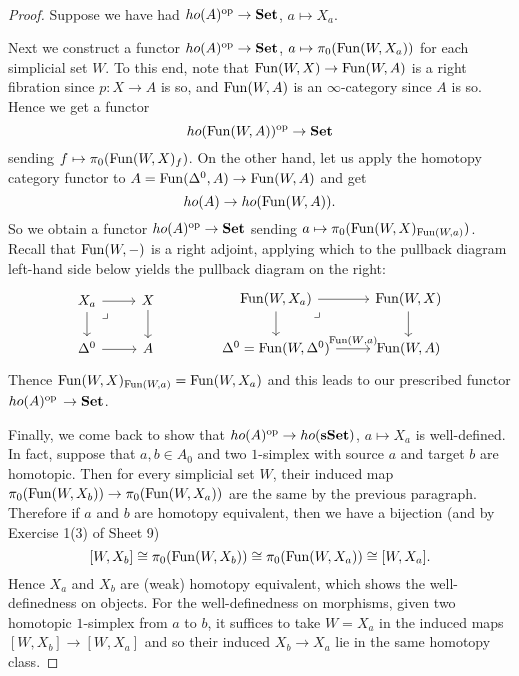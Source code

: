 \documentclass[a4paper,11pt,openany]{scrartcl}
\begin{document}
~\\
\begin{proof}
Suppose we have had $ho(A)^{\operatorname{op}}\to\operatorname{\mathbf{Set}}$, $a\mapsto X_a$.

Next we construct a functor $ho(A)^{\operatorname{op}}\to\operatorname{\mathbf{Set}}$, $a\mapsto\pi_0(\operatorname{Fun}(W,X_a))$ for each simplicial set $W$. To this end, note that $\operatorname{Fun}(W,X)\to\operatorname{Fun}(W,A)$ is a right fibration since $p\colon X\to A$ is so, and $\operatorname{Fun}(W,A)$ is an $\infty$-category since $A$ is so. Hence we get a functor 
\[
ho(\operatorname{Fun}(W,A))^{\operatorname{op}}\to\operatorname{\mathbf{Set}}
\]
sending $f\mapsto\pi_0(\operatorname{Fun}(W,X)_f)$. On the other hand, let us apply the homotopy category functor to $A=\operatorname{Fun}(\Delta^0,A)\to\operatorname{Fun}(W,A)$ and get 
\[
ho(A)\to ho(\operatorname{Fun}(W,A)).
\]
So we obtain a functor $ho(A)^{\operatorname{op}}\to\operatorname{\mathbf{Set}}$ sending $a\mapsto\pi_0(\operatorname{Fun}(W,X)_{\operatorname{Fun}(W,a)})$. Recall that $\operatorname{Fun}(W,-)$ is a right adjoint, applying which to the pullback diagram left-hand side below yields the pullback diagram on the right:
\[
\begin{tikzcd}
X_a\arrow[r]\arrow[d]\arrow[dr,phantom,"\lrcorner",very near start]& X\arrow[d]\\
\Delta^0\arrow[r]& A
\end{tikzcd}
\qquad\qquad
\begin{tikzcd}
\Fun(W,X_a)\arrow[r]\arrow[d]\arrow[dr,phantom,"\lrcorner",very near start]& \Fun(W,X)\arrow[d]\\
\Delta^0=\Fun(W,\Delta^0)\arrow[r,"\Fun(W\text{,}a)"]& \Fun(W,A)
\end{tikzcd}
\]
Thence $\operatorname{Fun}(W,X)_{\operatorname{Fun}(W,a)}=\operatorname{Fun}(W,X_a)$ and this leads to our prescribed functor $ho(A)^{\operatorname{op}}$ $\to\operatorname{\mathbf{Set}}$.

Finally, we come back to show that $ho(A)^{\operatorname{op}}\to ho(\operatorname{\mathbf{sSet}})$, $a\mapsto X_a$ is well-defined. In fact, suppose that $a,b\in A_0$ and two $1$-simplex with source $a$ and target $b$ are homotopic. Then for every simplicial set $W$, their induced map $\pi_0(\operatorname{Fun}(W,X_b))\to\pi_0(\operatorname{Fun}(W,X_a))$ are the same by the previous paragraph. Therefore if $a$ and $b$ are homotopy equivalent, then we have a bijection (and by Exercise 1(3) of Sheet 9)
\[
[W,X_b]\cong\pi_0(\operatorname{Fun}(W,X_b))\cong\pi_0(\operatorname{Fun}(W,X_a))\cong[W,X_a].
\]
Hence $X_a$ and $X_b$ are (weak) homotopy equivalent, which shows the well-definedness on objects. For the well-definedness on morphisms, given two homotopic $1$-simplex from $a$ to $b$, it suffices to take $W=X_a$ in the induced maps $[W,X_b]\to[W,X_a]$ and so their induced $X_b\to X_a$ lie in the same homotopy class.
\end{proof}
\end{document}
